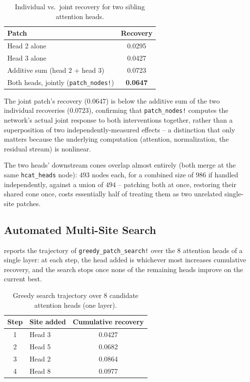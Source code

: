 \documentclass{article}
\begin{document}
\begin{table}[H]
\centering
\caption{Individual vs.\ joint recovery for two sibling attention heads.}
\label{tab:composable}
\begin{tabular}{l c}
\toprule
\textbf{Patch} & \textbf{Recovery} \\
\midrule
Head 2 alone & 0.0295 \\
Head 3 alone & 0.0427 \\
Additive sum (head 2 + head 3) & 0.0723 \\
\rowcolor{rowgray}
Both heads, jointly (\texttt{patch\_nodes!}) & \textbf{0.0647} \\
\bottomrule
\end{tabular}
\end{table}

The joint patch's recovery ($0.0647$) is below the additive sum of the two individual recoveries
($0.0723$), confirming that \texttt{patch\_nodes!} computes the network's actual joint response
to both interventions together, rather than a superposition of two independently-measured
effects -- a distinction that only matters because the underlying computation (attention,
normalization, the residual stream) is nonlinear.

The two heads' downstream cones overlap almost entirely (both merge at the same
\texttt{hcat\_heads} node): $493$ nodes each, for a combined size of $986$ if handled
independently, against a union of $494$ -- patching both at once, restoring their shared cone
once, costs essentially half of treating them as two unrelated single-site patches.

\subsection{Automated Multi-Site Search}

 reports the trajectory of \texttt{greedy\_patch\_search!} over the 8 attention
heads of a single layer: at each step, the head added is whichever most increases cumulative
recovery, and the search stops once none of the remaining heads improve on the current best.

\begin{table}[H]
\centering
\caption{Greedy search trajectory over 8 candidate attention heads (one layer).}
\label{tab:greedy}
\begin{tabular}{c l c}
\toprule
\textbf{Step} & \textbf{Site added} & \textbf{Cumulative recovery} \\
\midrule
1 & Head 3 & 0.0427 \\
\rowcolor{rowgray}
2 & Head 5 & 0.0682 \\
3 & Head 2 & 0.0864 \\
\rowcolor{rowgray}
4 & Head 8 & 0.0977 \\
\bottomrule
\end{tabular}
\end{table}
\end{document}
